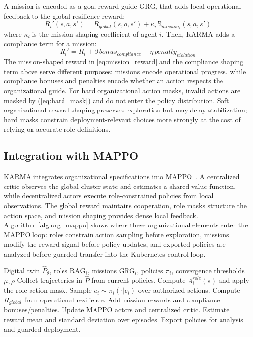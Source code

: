 \documentclass[journal]{IEEEtran}
\newcommand{\rag}{\mathrm{RAG}}
\newcommand{\grg}{\mathrm{GRG}}
\begin{document}
A mission is encoded as a goal reward guide $\grg_i$ that adds local operational feedback to the global resilience reward:
\begin{equation}
  R_i'(s,a,s')=R_{global}(s,a,s')+\kappa_i R_{mission_i}(s,a,s')
  \label{eq:mission_reward}
\end{equation}
where $\kappa_i$ is the mission-shaping coefficient of agent $i$.
Then, KARMA adds a compliance term for a  mission:
\[
  R_i'=R_i+\beta\,bonus_{compliance}-\eta\,penalty_{violation}
\]
The mission-shaped reward in \autoref{eq:mission_reward} and the compliance shaping term above serve different purposes: missions encode operational progress, while compliance bonuses and penalties encode whether an action respects the organizational guide. For hard organizational action masks, invalid actions are masked by (\autoref{eq:hard_mask}) and do not enter the policy distribution. Soft organizational reward shaping preserves exploration but may delay stabilization; hard masks constrain deployment-relevant choices more strongly at the cost of relying on accurate role definitions.

\subsection{Integration with MAPPO}
\label{subsec:mappo_integration}

KARMA integrates organizational specifications into MAPPO~\cite{Yu2022}. A centralized critic observes the global cluster state and estimates a shared value function, while decentralized actors execute role-constrained policies from local observations. The global reward maintains cooperation, role masks structure the action space, and mission shaping provides dense local feedback.
%
Algorithm~\ref{alg:org_mappo} shows where these organizational elements enter the MAPPO loop: roles constrain action sampling before exploration, missions modify the reward signal before policy updates, and exported policies are analyzed before guarded transfer into the Kubernetes control loop.

\begin{algorithm}[t]
  \caption{Organizationally-Guided MAPPO in KARMA}
  \label{alg:org_mappo}
  \scriptsize
  \begin{algorithmic}[1]
    \REQUIRE Digital twin $\hat{P}_\theta$, roles $\rag_i$, missions $\grg_i$, policies $\pi_i$, convergence thresholds $\mu,\rho$
    \REPEAT
    \STATE Collect trajectories in $\hat{P}$ from current policies.
    \STATE Compute $A_i^{role}(s)$ and apply the role action mask.
    \STATE Sample $a_i\sim\pi_i(\cdot|o_i)$ over authorized actions.
    \ENDFOR
    \STATE Compute $R_{global}$ from operational resilience.
    \STATE Add mission rewards and compliance bonuses/penalties.
    \STATE Update MAPPO actors and centralized critic.
    \STATE Estimate reward mean and standard deviation over episodes.
    \STATE Export policies for analysis and guarded deployment.
  \end{algorithmic}
\end{algorithm}
\end{document}
